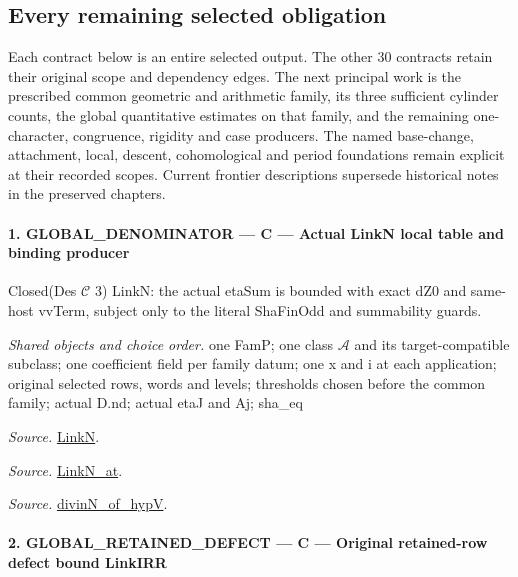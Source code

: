 \subsection{Every remaining selected obligation}

Each contract below is an entire selected output.  The other 30
contracts retain their original scope and dependency edges.
The next principal work is the prescribed common geometric and
arithmetic family, its three sufficient cylinder counts, the
global quantitative estimates on that family, and the remaining
one-character, congruence, rigidity and case producers.  The named
base-change, attachment, local, descent, cohomological and period
foundations remain explicit at their recorded scopes.  Current
frontier descriptions supersede historical notes in the preserved
chapters.
\paragraph{1. GLOBAL\_\allowbreak DENOMINATOR — C — Actual LinkN local table and binding producer}

Closed(Des $\mathcal C$ 3) LinkN: the actual etaSum is bounded with exact dZ0 and same-host vvTerm, subject only to the literal ShaFinOdd and summability guards.

\emph{Shared objects and choice order.} one FamP; one class $\mathcal A$ and its target-compatible subclass; one coefficient field per family datum; one x and i at each application; original selected rows, words and levels; thresholds chosen before the common family; actual D.nd; actual etaJ and Aj; sha\_\allowbreak eq

\emph{Source.} \href{https://github.com/CocoSgt/riemann-hypothesis-lean/blob/7cbf7a0c32fca1badf05931879a37c3f8a2b03b4/src/Formalism/SharpRestriction/GlobalTheoremInputs.lean#L45-L48}{LinkN}.

\emph{Source.} \href{https://github.com/CocoSgt/riemann-hypothesis-lean/blob/7cbf7a0c32fca1badf05931879a37c3f8a2b03b4/src/Formalism/SharpRestriction/GlobalTheoremInputs.lean#L40-L44}{LinkN\_\allowbreak at}.

\emph{Source.} \href{https://github.com/CocoSgt/riemann-hypothesis-lean/blob/7cbf7a0c32fca1badf05931879a37c3f8a2b03b4/src/Development/AutomorphicArithmetic/CharacterBoxes/DivinNOfHypV.lean#L117-L134}{divinN\_\allowbreak of\_\allowbreak hypV}.



\paragraph{2. GLOBAL\_\allowbreak RETAINED\_\allowbreak DEFECT — C — Original retained-row defect bound LinkIRR}

